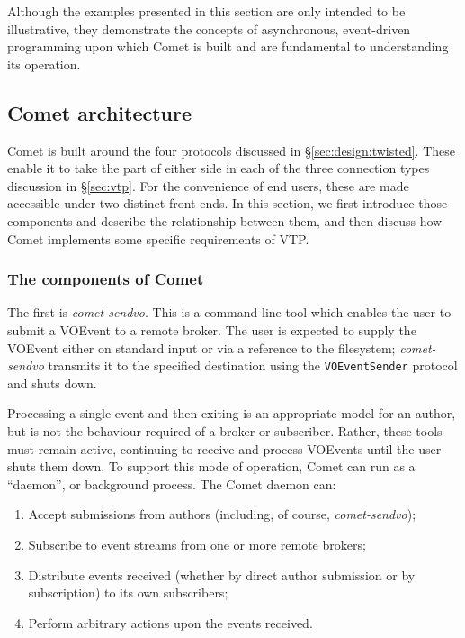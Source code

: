 \documentclass[5p,authoryear]{elsarticle}
\begin{document}
Although the examples presented in this section are only intended to be
illustrative, they demonstrate the concepts of asynchronous, event-driven
programming upon which Comet is built and are fundamental to understanding its
operation.

\subsection{Comet architecture}
\label{sec:design:architecture}

Comet is built around the four protocols discussed in
\S\ref{sec:design:twisted}. These enable it to take the part of either side in
each of the three connection types discussion in \S\ref{sec:vtp}. For the
convenience of end users, these are made accessible under two distinct front
ends. In this section, we first introduce those components and describe the
relationship between them, and then discuss how Comet implements some specific
requirements of VTP.

\subsubsection{The components of Comet}
\label{sec:design:components}

The first is \textit{comet-sendvo}. This is a command-line tool which enables
the user to submit a VOEvent to a remote broker. The user is expected to
supply the VOEvent either on standard input or via a reference to the
filesystem; \textit{comet-sendvo} transmits it to the specified destination
using the \texttt{VOEventSender} protocol and shuts down.

Processing a single event and then exiting is an appropriate model for an
author, but is not the behaviour required of a broker or subscriber. Rather,
these tools must remain active, continuing to receive and process VOEvents
until the user shuts them down. To support this mode of operation, Comet can
run as a ``daemon'', or background process. The Comet daemon can:

\begin{enumerate}

  \item{Accept submissions from authors (including, of course, \textit{comet-sendvo});}

  \item{Subscribe to event streams from one or more remote brokers;}

  \item{Distribute events received (whether by direct author submission or by subscription) to its own subscribers;}

  \item{Perform arbitrary actions upon the events received.}

\end{enumerate}
\end{document}

